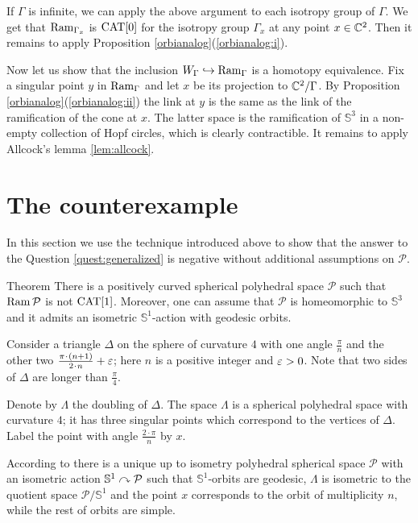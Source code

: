 \documentclass[oneside,a4paper]{article}
\begin{document}
If $\Gamma$ is infinite, we can apply the above argument to each isotropy group
of $\Gamma$.
We get that $\mathop{\rm Ram}\nolimits_{\Gamma_x}$ is $\mathrm{CAT}[0]$
for the isotropy group $\Gamma_x$ at any point $x\in\mathbb{C}^2$.
Then it remains to apply Proposition \ref{orbianalog}(\ref{orbianalog:i}).

Now let us show that the inclusion $W_\Gamma\hookrightarrow \mathop{\rm Ram}\nolimits_\Gamma$ is a homotopy equivalence.
Fix a singular point $y$ in $\mathop{\rm Ram}\nolimits_\Gamma$
and let $x$ be its projection to $\mathbb{C}^2/\Gamma$.
By Proposition \ref{orbianalog}(\ref{orbianalog:ii})
the link at $y$ is the same as the link of the ramification of the cone at $x$.
The latter space is the ramification of $\mathbb{S}^3$ in a non-empty collection of Hopf circles,
which is clearly contractible.
It remains to apply Allcock's lemma \ref{lem:allcock}.
\qeds

\section{The counterexample}

In this section we use the technique introduced above to show that
the answer to the Question \ref{quest:generalized} is negative
without additional assumptions on $\mathcal{P}$.

\begin{thm}{Theorem}\label{notCAT[1]} There is a positively curved spherical polyhedral space $\mathcal{P}$ 
such that $\mathop{\rm Ram}\nolimits \mathcal{P}$ is not $\mathrm{CAT}[1]$.
Moreover, one can assume that $\mathcal{P}$ is homeomorphic to $\mathbb{S}^3$
and it admits an isometric $\mathbb{S}^1$-action
with geodesic orbits.
\end{thm}

Consider a triangle $\Delta$ on the sphere of curvature $4$ with one angle $\frac{\pi}{n}$ and the other two $\frac{\pi{\cdot}(n+1)}{2{\cdot} n}\z+\varepsilon$;
here $n$ is a positive integer and $\varepsilon>0$.
Note that two sides of $\Delta$
are longer than $\frac{\pi}{4}$.

Denote by $\Lambda$ the doubling of $\Delta$.
The space $\Lambda$ is a spherical polyhedral space with curvature $4$;
it has three singular points which correspond to the vertices of $\Delta$.
Label the point with angle $\frac{2\cdot\pi}{n}$ by $x$.

According to \cite[Theorem 1.8]{panov} there is a unique up to isometry
polyhedral spherical space $\mathcal{P}$
with an isometric action $\mathbb{S}^1\curvearrowright\mathcal{P}$
such that $\mathbb{S}^1$-orbits are geodesic,
$\Lambda$ is isometric to the quotient space $\mathcal{P}/\mathbb{S}^1$
and the point $x$ corresponds to the orbit of multiplicity $n$,
while the rest of orbits are simple.
\end{document}
